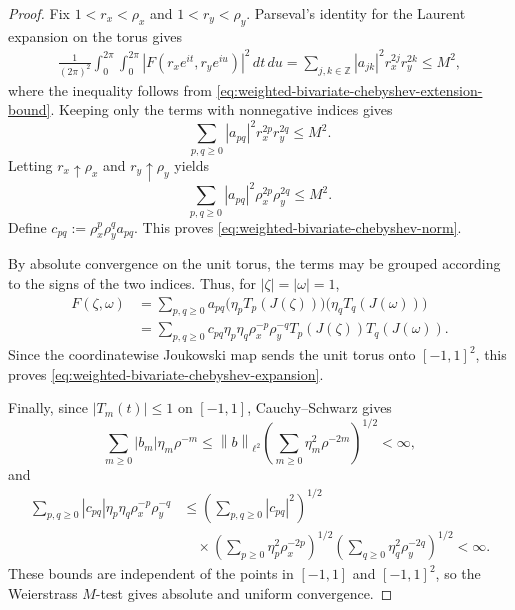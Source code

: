 \documentclass[11pt]{article}
\theoremstyle{definition}
\theoremstyle{remark}
\newcommand{\norm}[1]{\left\lVert #1\right\rVert}
\newcommand{\abs}[1]{\left\lvert #1\right\rvert}
\begin{document}
\begin{proof}
Fix $1<r_x<\rho_x$ and $1<r_y<\rho_y$. Parseval's identity for the
Laurent expansion on the torus gives
\begin{equation*}
\begin{aligned}
    \frac1{(2\pi)^2}
    \int_0^{2\pi}\int_0^{2\pi}
    \abs{F(r_xe^{it},r_ye^{iu})}^2\,dt\,du
    =
    \sum_{j,k\in\mathbb Z}
    \abs{a_{jk}}^2r_x^{2j}r_y^{2k}
    \le M^2,
\end{aligned}
\end{equation*}
where the inequality follows from
\eqref{eq:weighted-bivariate-chebyshev-extension-bound}.
Keeping only the terms with nonnegative indices gives
\[
    \sum_{p,q\ge0}
    \abs{a_{pq}}^2r_x^{2p}r_y^{2q}
    \le M^2.
\]
Letting $r_x\uparrow\rho_x$ and $r_y\uparrow\rho_y$ yields
\[
    \sum_{p,q\ge0}
    \abs{a_{pq}}^2\rho_x^{2p}\rho_y^{2q}
    \le M^2.
\]
Define
$
    c_{pq}:=\rho_x^p\rho_y^qa_{pq}.
$
This proves \eqref{eq:weighted-bivariate-chebyshev-norm}.

By absolute convergence on the unit torus, the terms may be grouped
according to the signs of the two indices. Thus, for
$\abs{\zeta}=\abs{\omega}=1$,
\[
\begin{aligned}
    F(\zeta,\omega)
    &=
    \sum_{p,q\ge0}
    a_{pq}
    \bigl(\eta_pT_p(J(\zeta))\bigr)
    \bigl(\eta_qT_q(J(\omega))\bigr)\\
    &=
    \sum_{p,q\ge0}
    c_{pq}\eta_p\eta_q
    \rho_x^{-p}\rho_y^{-q}
    T_p(J(\zeta))T_q(J(\omega)).
\end{aligned}
\]
Since the coordinatewise Joukowski map sends the unit torus onto $[-1, 1]^2$,
this proves \eqref{eq:weighted-bivariate-chebyshev-expansion}.


Finally, since $\abs{T_m(t)}\le1$ on $[-1, 1]$, Cauchy--Schwarz gives
\[
    \sum_{m\ge0}\abs{b_m}\eta_m\rho^{-m}
    \le
    \norm{b}_{\ell^2}
    \left(\sum_{m\ge0}\eta_m^2\rho^{-2m}\right)^{1/2}
    <\infty,
\]
and
\[
\begin{aligned}
    \sum_{p,q\ge0}
    \abs{c_{pq}}\eta_p\eta_q\rho_x^{-p}\rho_y^{-q}
    &\le
    \left(\sum_{p,q\ge0}\abs{c_{pq}}^2\right)^{1/2}\\
    &\quad\times
    \left(\sum_{p\ge0}\eta_p^2\rho_x^{-2p}\right)^{1/2}
    \left(\sum_{q\ge0}\eta_q^2\rho_y^{-2q}\right)^{1/2}
    <\infty.
\end{aligned}
\]
These bounds are independent of the points in $[-1, 1]$ and $[-1, 1]^2$, so the
Weierstrass $M$-test gives absolute and uniform convergence.


\end{proof}
\end{document}
